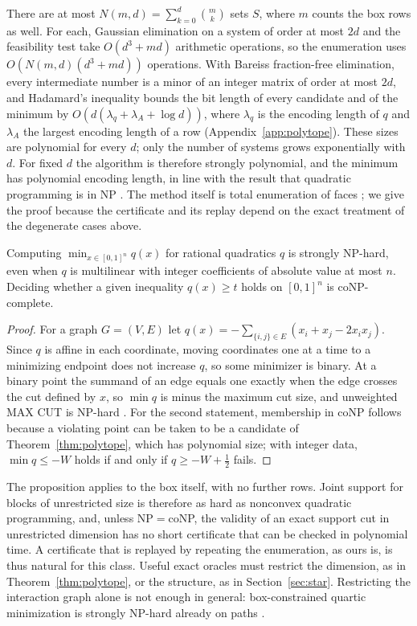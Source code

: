 There are at most $N(m,d)=\sum_{k=0}^d\binom mk$ sets $S$, where $m$
counts the box rows as well. For each, Gaussian elimination on a system
of order at most $2d$ and the feasibility test take $O(d^3+md)$
arithmetic operations, so the enumeration uses $O(N(m,d)(d^3+md))$
operations. With Bareiss fraction-free elimination, every intermediate
number is a minor of an integer matrix of order at most $2d$, and
Hadamard's inequality bounds the bit length of every candidate and of
the minimum by $O(d(\lambda_q+\lambda_A+\log d))$, where $\lambda_q$ is
the encoding length of $q$ and $\lambda_A$ the largest encoding length of
a row (Appendix~\ref{app:polytope}). These sizes are polynomial for every
$d$; only the number of systems grows exponentially with $d$. For fixed
$d$ the algorithm is therefore strongly polynomial, and the minimum has
polynomial encoding length, in line with the result that quadratic
programming is in NP \citep{Vavasis1990}. The method itself is total
enumeration of faces \citep[Section~2.9]{Murty1997}; we give the proof
because the certificate and its replay depend on the exact treatment of
the degenerate cases above.

\begin{proposition}\label{prop:maxcut}
Computing $\min_{x\in[0,1]^n}q(x)$ for rational quadratics $q$ is strongly
NP-hard, even when $q$ is multilinear with integer coefficients of
absolute value at most $n$. Deciding whether a given inequality
$q(x)\ge t$ holds on $[0,1]^n$ is coNP-complete.
\end{proposition}

\begin{proof}
For a graph $G=(V,E)$ let $q(x)=-\sum_{\{i,j\}\in E}(x_i+x_j-2x_ix_j)$.
Since $q$ is affine in each coordinate, moving coordinates one at a time
to a minimizing endpoint does not increase $q$, so some minimizer is
binary. At a binary point the summand of an edge equals one exactly
when the edge crosses the cut defined by $x$, so $\min q$ is minus the
maximum cut size, and unweighted MAX CUT is NP-hard
\citep{Karp1972,GareyJohnsonStockmeyer1976}. For the second statement,
membership in coNP follows because a violating point can be taken to be
a candidate of Theorem~\ref{thm:polytope}, which has polynomial size; with
integer data, $\min q\le-W$ holds if and only if $q\ge-W+\tfrac12$ fails.
\end{proof}

The proposition applies to the box itself, with no further rows. Joint
support for blocks of unrestricted size is therefore as hard as
nonconvex quadratic programming, and, unless NP${}={}$coNP, the validity
of an exact support cut in unrestricted dimension has no short certificate
that can be checked in polynomial time. A certificate that is replayed by
repeating the enumeration, as ours is, is thus natural for this class.
Useful exact oracles must restrict the dimension, as in
Theorem~\ref{thm:polytope}, or the structure, as in
Section~\ref{sec:star}. Restricting the interaction graph alone is not
enough in general: box-constrained quartic minimization is strongly
NP-hard already on paths \citep{DelPiaKhajavirad2026}.

